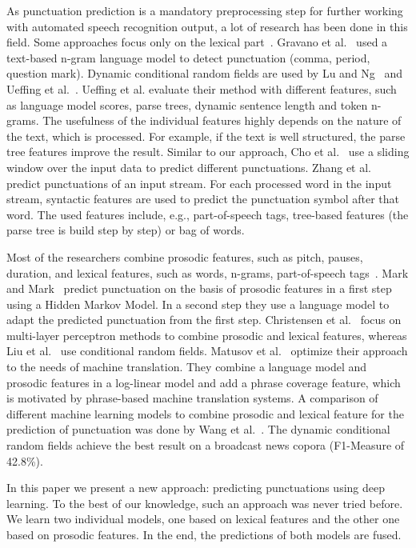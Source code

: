 As punctuation prediction is a mandatory preprocessing step for further working with automated speech recognition output, a lot of research has been done in this field.
Some approaches focus only on the lexical part~\cite{Gravano2009, Lu2010, Ueffing2013, Cho2012, Zhang2013}.
Gravano et al.~\cite{Gravano2009} used a text-based n-gram language model to detect punctuation (comma, period, question mark).
Dynamic conditional random fields are used by Lu and Ng~\cite{Lu2010} and Ueffing et al.~\cite{Ueffing2013}.
Ueffing et al. evaluate their method with different features, such as language model scores, parse trees, dynamic sentence length and token n-grams.
The usefulness of the individual features highly depends on the nature of the text, which is processed.
For example, if the text is well structured, the parse tree features improve the result.
Similar to our approach, Cho et al.~\cite{Cho2012} use a sliding window over the input data to predict different punctuations.
Zhang et al.~\cite{Zhang2013} predict punctuations of an input stream.
For each processed word in the input stream, syntactic features are used to predict the punctuation symbol after that word.
The used features include, e.g., part-of-speech tags, tree-based features (the parse tree is build step by step) or bag of words.

Most of the researchers combine prosodic features, such as pitch, pauses, duration, and lexical features, such as words, n-grams, part-of-speech tags~\cite{Mark1999, Christensen2001, Liu2005, Matusov2007, Wang2012}.
Mark and Mark~\cite{Mark1999} predict punctuation on the basis of prosodic features in a first step using a Hidden Markov Model.
In a second step they use a language model to adapt the predicted punctuation from the first step.
Christensen et al.~\cite{Christensen2001} focus on multi-layer perceptron methods to combine prosodic and lexical features, whereas Liu et al.~\cite{Liu2005} use conditional random fields.
Matusov et al.~\cite{Matusov2007} optimize their approach to the needs of machine translation.
They combine a language model and prosodic features in a log-linear model and add a phrase coverage feature, which is motivated by phrase-based machine translation systems.
A comparison of different machine learning models to combine prosodic and lexical feature for the prediction of punctuation was done by Wang et al.~\cite{Wang2012}.
The dynamic conditional random fields achieve the best result on a broadcast news copora (F1-Measure of 42.8\%).

In this paper we present a new approach: predicting punctuations using deep learning.
To the best of our knowledge, such an approach was never tried before.
We learn two individual models, one based on lexical features and the other one based on prosodic features.
In the end, the predictions of both models are fused.

